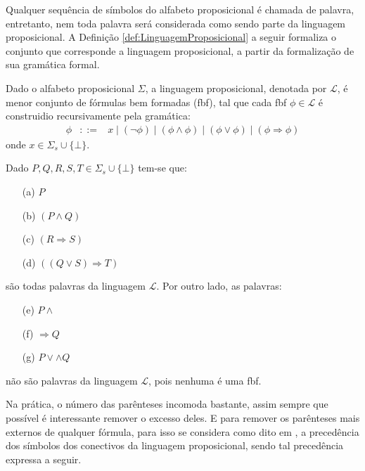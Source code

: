 Qualquer sequência de símbolos do alfabeto proposicional é chamada de palavra, entretanto, nem toda palavra será considerada como sendo parte da linguagem proposicional. A Definição \ref{def:LinguagemProposicional} a seguir formaliza o conjunto que corresponde a linguagem proposicional, a partir da formalização de sua gramática formal.

\begin{definicao}\label{def:LinguagemProposicional}
  Dado o alfabeto proposicional $\Sigma$, a linguagem proposicional, denotada por $\mathcal{L}$, é menor conjunto de fórmulas bem formadas (fbf), tal que cada fbf $\phi \in \mathcal{L}$ é construidio recursivamente pela gramática:
  \begin{eqnarray*}
    \phi & ::= & x \mid (\neg \phi) \mid (\phi \land \phi)  \mid (\phi \lor \phi) \mid (\phi \Rightarrow \phi) 
  \end{eqnarray*}
  onde $x \in \Sigma_s \cup \{\bot\}$.
\end{definicao}

\begin{exemplo}\label{exe:PalavrasProposicionaisBemFormadas}
  Dado $P, Q, R, S, T \in \Sigma_s \cup \{\bot\}$ tem-se que:
  \begin{itemize}
      \item[(a)] $P$
      \item[(b)] $(P \land Q)$
      \item[(c)] $(R \Rightarrow S)$
      \item[(d)] $((Q \lor S) \Rightarrow T)$
  \end{itemize}
  são todas palavras da linguagem $\mathcal{L}$. Por outro lado, as palavras:
  \begin{itemize}
      \item[(e)] $P \land$
      \item[(f)] $\Rightarrow Q$
      \item[(g)] $P \lor \land Q$
  \end{itemize}
  não são palavras da linguagem $\mathcal{L}$, pois nenhuma é uma fbf.
\end{exemplo}

Na prática, o número das parênteses incomoda bastante, assim sempre que possível é interessante remover o excesso deles. E para remover os parênteses mais externos de qualquer fórmula, para isso se considera como dito em \cite{stanford-dic-1}, a precedência dos símbolos dos conectivos da linguagem proposicional, sendo tal precedência expressa a seguir. 

